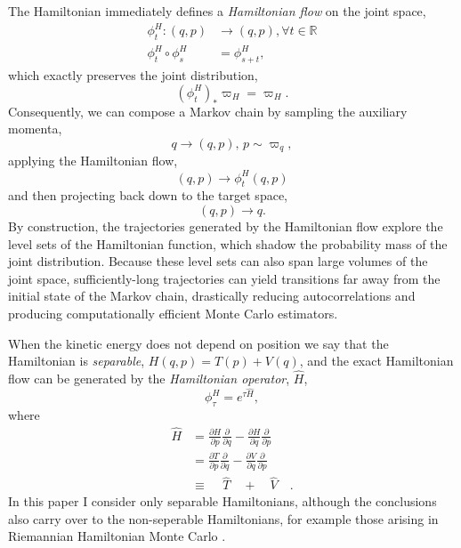 \documentclass{article}
\begin{document}
The Hamiltonian immediately defines a \textit{Hamiltonian flow} on the joint
space,
%
\begin{align*}
\phi^{H}_{t} : (q, p) &\rightarrow (q, p), \forall t \in \mathbb{R}
\\
\phi^{H}_{t} \circ \phi^{H}_{s} &= \phi^{H}_{s + t},
\end{align*}
%
which exactly preserves the joint distribution,
%
\begin{equation*}
\left( \phi^{H}_{t} \right)_{*} \varpi_{H} = \varpi_{H}.
\end{equation*}
%
Consequently, we can compose a Markov chain by sampling the auxiliary momenta, 
%
\begin{equation*}
q \rightarrow (q, p), \, p \sim \varpi_{q},
\end{equation*}
%
applying the Hamiltonian flow,
%
\begin{equation*}
(q, p) \rightarrow \phi^{H}_{t} (q, p)
\end{equation*}
%
and then projecting back down to the target space,
%
\begin{equation*}
(q, p) \rightarrow q.
\end{equation*}
%
By construction, the trajectories generated by the Hamiltonian flow 
explore the level sets of the Hamiltonian function, which shadow the
probability mass of the joint distribution.  Because these level sets
can also span large volumes of the joint space, sufficiently-long 
trajectories can yield transitions far away from the initial state of the 
Markov chain, drastically reducing autocorrelations and producing 
computationally efficient Monte Carlo estimators.

When the kinetic energy does not depend on position we say that
the Hamiltonian is \textit{separable}, $H (q, p) = T (p) + V (q)$,  and
the exact Hamiltonian flow can be generated by the \textit{Hamiltonian operator}, 
$\hat{H}$,
%
\begin{equation*}
\phi^{H}_{\tau} = e^{\tau \hat{H}},
\end{equation*}
%
where
%
\begin{align*}
\hat{H} 
&= 
\frac{ \partial H }{ \partial p } \frac{ \partial }{ \partial q}
- \frac{ \partial H }{ \partial q } \frac{ \partial }{ \partial p}
\\
&= 
\frac{ \partial T }{ \partial p } \frac{ \partial }{ \partial q}
- \frac{ \partial V }{ \partial q } \frac{ \partial }{ \partial p}
\\
&\equiv
\quad\, \hat{T} \quad + \quad \hat{V} \quad.
\end{align*}
%
In this paper I consider only separable Hamiltonians, although
the conclusions also carry over to the non-seperable Hamiltonians,
for example those arising in
Riemannian Hamiltonian Monte Carlo \cite{GirolamiEtAl:2011}.
\end{document}
